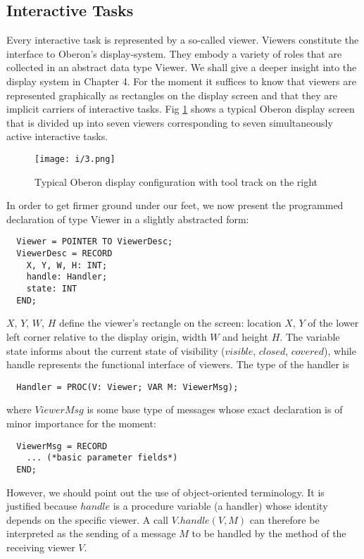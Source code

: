 \subsection{Interactive Tasks}
Every interactive task is represented by a so-called viewer. Viewers constitute the interface to
Oberon's display-system. They embody a variety of roles that are collected in an abstract data
type Viewer. We shall give a deeper insight into the display system in Chapter 4. For the moment
it suffices to know that viewers are represented graphically as rectangles on the display screen
and that they are implicit carriers of interactive tasks. Fig \ref{fig:configuration} shows a typical Oberon display
screen that is divided up into seven viewers corresponding to seven simultaneously active interactive tasks.
\begin{figure}
	\centering
	\texttt{[image: i/3.png]}
	\caption{Typical Oberon display configuration with tool track on the right}
	\label{fig:configuration}
\end{figure}

In order to get firmer ground under our feet, we now present the programmed declaration of type Viewer in a slightly abstracted form:
\begin{verbatim}
  Viewer = POINTER TO ViewerDesc;
  ViewerDesc = RECORD
    X, Y, W, H: INT;
    handle: Handler;
    state: INT
  END;
\end{verbatim}
$X$, $Y$, $W$, $H$ define the viewer's rectangle on the screen: location $X$, $Y$ of the lower left corner relative to the display origin, width $W$ and height $H$. The variable state informs about the current state of visibility ($visible$, $closed$, $covered$), while handle represents the functional interface of
viewers. The type of the handler is
\begin{verbatim}
  Handler = PROC(V: Viewer; VAR M: ViewerMsg);
\end{verbatim}
where $ViewerMsg$ is some base type of messages whose exact declaration is of minor importance for the moment:
\begin{verbatim}
  ViewerMsg = RECORD
    ... (*basic parameter fields*)
  END;
\end{verbatim}
However, we should point out the use of object-oriented terminology. It is justified because $handle$ is a procedure variable (a handler) whose identity depends on the specific viewer. A call $V.handle(V, M)$ can therefore be interpreted as the sending of a message $M$ to be handled by the method of the receiving viewer $V$.

